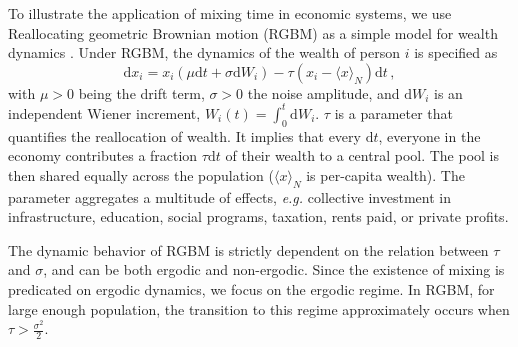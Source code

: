 \documentclass[11pt]{article}
\newcommand{\eg}{{\it e.g.}\xspace}
\newcommand{\be}{\begin{equation}}
\newcommand{\ee}{\end{equation}}
\numberwithin{equation}{section}
\begin{document}
To illustrate the application of mixing time in economic systems, we use Reallocating geometric Brownian motion (RGBM) as a simple model for wealth dynamics \citep{BermanPetersAdamou2019}. Under RGBM, the dynamics of the wealth of person $i$ is specified as
%
\be
\mathrm{d} x_i = x_i \left( \mu \mathrm{d}t + \sigma \mathrm{d}W_i \right) - \tau \left( x_i - \langle x \rangle_N \right) \mathrm{d}t\,,
\label{eq:rgbm}
\ee
%
with $\mu > 0$ being the drift term, $\sigma > 0$ the noise amplitude, and $\mathrm{d}W_i$ is an independent Wiener increment, $W_i(t) =\int_0^t \mathrm{d}W_i$. $\tau$ is a parameter that quantifies the reallocation of wealth. It implies that every $\mathrm{d}t$, everyone in the economy contributes a fraction $\tau\mathrm{d}t$ of their wealth to a central pool. The pool is then shared equally across the population ($\langle x \rangle_N$ is per-capita wealth). The parameter aggregates a multitude of effects, \eg collective investment in infrastructure, education, social programs, taxation, rents paid, or private profits.

The dynamic behavior of RGBM is strictly dependent on the relation between $\tau$ and $\sigma$, and can be both ergodic and non-ergodic. Since the existence of mixing is predicated on ergodic dynamics, we focus on the ergodic regime. In RGBM, for large enough population, the transition to this regime approximately occurs when $\tau > \frac{\sigma^2}{2}$.
\end{document}
